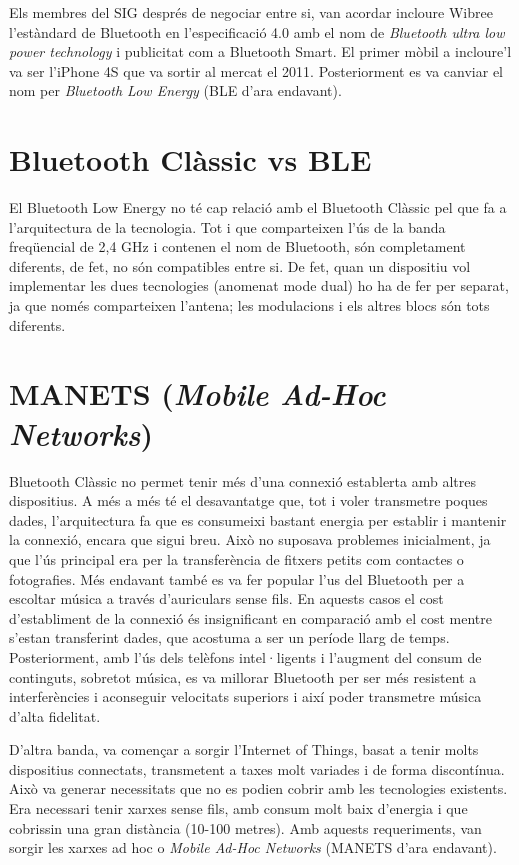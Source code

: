 Els membres del SIG després de negociar entre si, van acordar incloure Wibree l'estàndard de Bluetooth en l'especificació 4.0 amb el nom de \textit{Bluetooth ultra low power technology} i publicitat com a Bluetooth Smart. El primer mòbil a incloure'l va ser l'iPhone 4S que va sortir al mercat el 2011.
Posteriorment es va canviar el nom per \textit{Bluetooth Low Energy} (BLE d'ara endavant).

\section{Bluetooth Clàssic vs BLE}
El Bluetooth Low Energy no té cap relació amb el Bluetooth Clàssic pel que fa a l'arquitectura de la tecnologia.
Tot i que comparteixen l'ús de la banda freqüencial de 2,4 GHz i contenen el nom de Bluetooth, són completament diferents, de fet, no són compatibles entre si.
De fet, quan un dispositiu vol implementar les dues tecnologies (anomenat mode dual) ho ha de fer per separat, ja que només comparteixen l'antena; les modulacions i els altres blocs són tots diferents.

\section{MANETS (\textit{Mobile Ad-Hoc Networks})}
Bluetooth Clàssic no permet tenir més d'una connexió establerta amb altres dispositius.
A més a més té el desavantatge que, tot i voler transmetre poques dades, l'arquitectura fa que es consumeixi bastant energia per establir i mantenir la connexió, encara que sigui breu.
Això no suposava problemes inicialment, ja que l'ús principal era per la transferència de fitxers petits com contactes o fotografies.
Més endavant també es va fer popular l'us del Bluetooth per a escoltar música a través d'auriculars sense fils.
En aquests casos el cost d'establiment de la connexió és insignificant en comparació amb el cost mentre s'estan transferint dades, que acostuma a ser un període llarg de temps.
Posteriorment, amb l'ús dels telèfons intel·ligents i l'augment del consum de continguts, sobretot música, es va millorar Bluetooth per ser més resistent a interferències i aconseguir velocitats superiors i així poder transmetre música d'alta fidelitat.

D'altra banda, va començar a sorgir l'Internet of Things, basat a tenir molts dispositius connectats, transmetent a taxes molt variades i de forma discontínua.
Això va generar necessitats que no es podien cobrir amb les tecnologies existents.
Era necessari tenir xarxes sense fils, amb consum molt baix d'energia i que cobrissin una gran distància (10-100 metres).
Amb aquests requeriments, van sorgir les xarxes ad hoc o \textit{Mobile Ad-Hoc Networks} (MANETS d'ara endavant).

